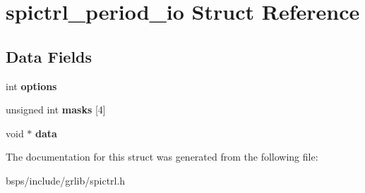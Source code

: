 \hypertarget{structspictrl__period__io}{}\section{spictrl\+\_\+period\+\_\+io Struct Reference}
\label{structspictrl__period__io}
\subsection*{Data Fields}
\begin{DoxyCompactItemize}
\item 
\mbox{\label{structspictrl__period__io_a9de341072169eabdd8857ece1f9dee40}} 
int {\bfseries options}
\item 
\mbox{\label{structspictrl__period__io_a589000d9a59403428632dbd12d6357b4}} 
unsigned int {\bfseries masks} \mbox{[}4\mbox{]}
\item 
\mbox{\label{structspictrl__period__io_a2b30d79e527a55eb2c14304c825f3c67}} 
void $\ast$ {\bfseries data}
\end{DoxyCompactItemize}


The documentation for this struct was generated from the following file\+:\begin{DoxyCompactItemize}
\item 
bsps/include/grlib/spictrl.\+h\end{DoxyCompactItemize}
